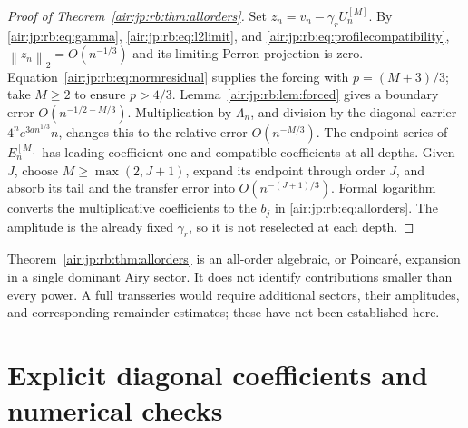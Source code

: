 \documentclass[11pt,letterpaper]{article}
\numberwithin{equation}{section}
\theoremstyle{remark}
\newcommand{\norm}[1]{\left\lVert#1\right\rVert}
\begin{document}
\begin{proof}[Proof of Theorem~\ref{air:jp:rb:thm:allorders}]
Set $z_n=v_n-\gamma_rU_n^{[M]}$. By \eqref{air:jp:rb:eq:gamma}, \eqref{air:jp:rb:eq:l2limit}, and \eqref{air:jp:rb:eq:profilecompatibility}, $\norm{z_n}_2=O(n^{-1/3})$ and its limiting Perron projection is zero. Equation~\eqref{air:jp:rb:eq:normresidual} supplies the forcing with $p=(M+3)/3$; take $M\ge2$ to ensure $p>4/3$. Lemma~\ref{air:jp:rb:lem:forced} gives a boundary error $O(n^{-1/2-M/3})$. Multiplication by $\Lambda_n$, and division by the diagonal carrier $4^ne^{3an^{1/3}}n$, changes this to the relative error $O(n^{-M/3})$. The endpoint series of $E_n^{[M]}$ has leading coefficient one and compatible coefficients at all depths. Given $J$, choose $M\ge\max(2,J+1)$, expand its endpoint through order $J$, and absorb its tail and the transfer error into $O(n^{-(J+1)/3})$. Formal logarithm converts the multiplicative coefficients to the $b_j$ in \eqref{air:jp:rb:eq:allorders}. The amplitude is the already fixed $\gamma_r$, so it is not reselected at each depth.
\end{proof}

Theorem~\ref{air:jp:rb:thm:allorders} is an all-order algebraic, or Poincar\'e, expansion in a single dominant Airy sector. It does not identify contributions smaller than every power. A full transseries would require additional sectors, their amplitudes, and corresponding remainder estimates; these have not been established here.

\section{Explicit diagonal coefficients and numerical checks}\label{air:jp:rb:sec:coefficients}
\end{document}
